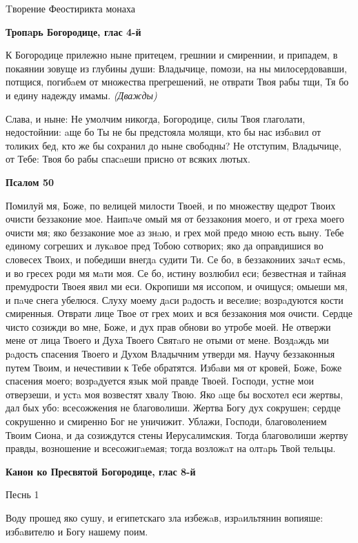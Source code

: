 Tворение Феостирикта монаха\normalfont{}


\medskip
\bfseries Тропaрь Богородице, глас 4-й\normalfont{}\nopagebreak


 К Богородице прилежно ныне притецем, грешнии и смиреннии, и припадем, в покаянии зовуще из глубины души: Владычице, помози, на ны милосердовавши, потщися, погибaем от множества прегрешений, не отврати Твоя рабы тщи, Тя бо и едину надежду имамы. \itshape (Дважды)\normalfont{}


 Слава, и ныне: Не умолчим никогда, Богородице, силы Твоя глаголати, недостойнии: aще бо Ты не бы предстояла молящи, кто бы нас избaвил от толиких бед, кто же бы сохранил до ныне свободны? Не отступим, Владычице, от Тебе: Твоя бо рабы спасaеши присно от всяких лютых.


\medskip
\bfseries Псалом 50\normalfont{}\nopagebreak


Помилуй мя, Боже, по велицей милости Твоей, и по множеству щедрот Твоих очисти беззаконие мое. Наипaче омый мя от беззакония моего, и от греха моего очисти мя; яко беззаконие мое аз знaю, и грех мой предо мною есть выну. Тебе единому согреших и лукaвое пред Тобою сотворих; яко да оправдишися во словесех Твоих, и победиши внегдa судити Ти. Се бо, в беззакониих зачaт есмь, и во гресех роди мя мaти моя. Се бо, истину возлюбил еси; безвестная и тайная премудрости Твоея явил ми еси. Окропиши мя иссопом, и очищуся; омыеши мя, и пaче снега убелюся. Слуху моему дaси рaдость и веселие; возрaдуются кости смиренныя. Отврати лице Твое от грех моих и вся беззакония моя очисти. Сердце чисто созижди во мне, Боже, и дух прав обнови во утробе моей. Не отвержи мене от лица Твоего и Духа Твоего Святaго не отыми от мене. Воздaждь ми рaдость спасения Твоего и Духом Владычним утверди мя. Научу беззаконныя путем Твоим, и нечестивии к Тебе обратятся. Избaви мя от кровей, Боже, Боже спасения моего; возрaдуется язык мой правде Твоей. Господи, устне мои отверзеши, и устa моя возвестят хвалу Твою. Яко aще бы восхотел еси жертвы, дал бых убо: всесожжения не благоволиши. Жертва Богу дух сокрушен; сердце сокрушенно и смиренно Бог не уничижит. Ублажи, Господи, благоволением Твоим Сиона, и да созиждутся стены Иерусалимския. Тогда благоволиши жертву правды, возношение и всесожигaемая; тогда возложaт на олтaрь Твой тельцы.


\medskip
\bfseries Канон ко Пресвятой Богородице, глас 8-й
\normalfont{}

\medskip
Песнь 1


Воду прошед яко сушу, и египетскаго зла избежaв, изрaильтянин вопияше: избaвителю и Богу нашему поим.



